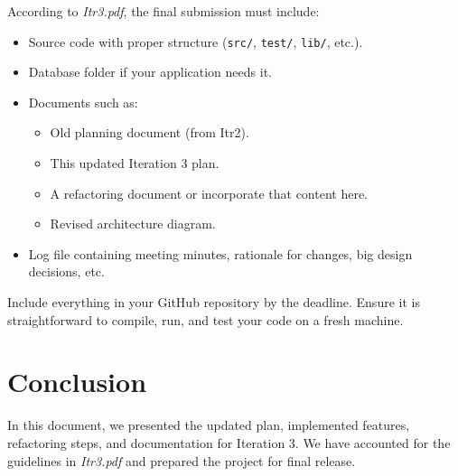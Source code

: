 \documentclass[12pt]{article}
\begin{document}
According to \emph{Itr3.pdf}, the final submission must include:
\begin{itemize}
    \item Source code with proper structure (\texttt{src/}, \texttt{test/}, \texttt{lib/}, etc.).
    \item Database folder if your application needs it.
    \item Documents such as:
    \begin{itemize}
        \item Old planning document (from Itr2).
        \item This updated Iteration 3 plan.
        \item A refactoring document or incorporate that content here.
        \item Revised architecture diagram.
    \end{itemize}
    \item Log file containing meeting minutes, rationale for changes, big design decisions, etc.
\end{itemize}

Include everything in your GitHub repository by the deadline. Ensure it is straightforward to compile, run, and test your code on a fresh machine.

\section{Conclusion}

In this document, we presented the updated plan, implemented features, refactoring steps,
and documentation for Iteration 3. We have accounted for the guidelines in
\emph{Itr3.pdf} and prepared the project for final release.

% 
% 
\end{document}
